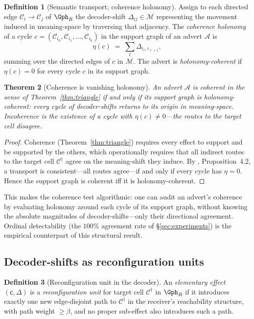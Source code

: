 \documentclass[twocolumn,11pt,a4paper]{article}
\theoremstyle{adv}
\newtheorem{theorem}{Theorem}[section]
\theoremstyle{definition}
\newtheorem{definition}[theorem]{Definition}
\theoremstyle{remark}
\newcommand{\Cell}{\mathcal{C}}        %
\newcommand{\Recv}{R}                  %
\newcommand{\floor}{\beta}            %
\newcommand{\Carrier}{\kappa}         %
\renewcommand{\Carrier}{\mathsf{c}}
\newcommand{\Mean}{\mathcal{M}}        %
\newcommand{\shift}{\Delta}            %
\newcommand{\Adv}{\mathcal{A}}        %
\begin{document}
\begin{definition}[Semantic transport; coherence holonomy]
\label{def:holonomy-ad}
Assign to each directed edge $\Cell_i\to\Cell_j$ of $\Gph_\Recv$ the
decoder-shift $\shift_{ij}\in\Mean$ representing the movement induced in
meaning-space by traversing that adjacency. The \emph{coherence holonomy} of a
cycle $c=(\Cell_{i_0},\Cell_{i_1},\dots,\Cell_{i_0})$ in the support graph of
an advert $\Adv$ is
\[
  \eta(c) \;=\; \sum_{\ell} \shift_{i_\ell,i_{\ell+1}},
\]
summing over the directed edges of $c$ in $\Mean$. The advert is
\emph{holonomy-coherent} if $\eta(c)=0$ for every cycle $c$ in its support
graph.
\end{definition}

\begin{theorem}[Coherence is vanishing holonomy]
\label{thm:coherence-holonomy}
An advert $\Adv$ is coherent in the sense of Theorem~\ref{thm:triangle} if and
only if its support graph is holonomy-coherent: every cycle of decoder-shifts
returns to its origin in meaning-space. Incoherence is the existence of a
cycle with $\eta(c)\neq0$---the routes to the target cell disagree.
\end{theorem}

\begin{proof}
Coherence (Theorem~\ref{thm:triangle}) requires every effect to support and
be supported by the others, which operationally requires that all indirect
routes to the target cell $\Cell^\dagger$ agree on the meaning-shift they
induce. By \citet{sachikonye2025knowledge}, Proposition~4.2, a transport is
consistent---all routes agree---if and only if every cycle has $\eta=0$.
Hence the support graph is coherent iff it is holonomy-coherent.
\end{proof}

This makes the coherence test algorithmic: one can audit an advert's coherence
by evaluating holonomy around each cycle of its support graph, without knowing
the absolute magnitudes of decoder-shifts---only their directional agreement.
Ordinal detectability (the $100\%$ agreement rate of \S\ref{sec:experiments})
is the empirical counterpart of this structural result.

\subsection{Decoder-shifts as reconfiguration units}

\begin{definition}[Reconfiguration unit in the decoder]
\label{def:reconfig-unit}
An \emph{elementary effect} $(\Carrier,\shift)$ is a \emph{reconfiguration unit}
for target cell $\Cell^\dagger$ in $\Gph_\Recv$ if it introduces exactly one new
edge-disjoint path to $\Cell^\dagger$ in the receiver's reachability structure,
with path weight $\ge\floor$, and no proper sub-effect also introduces such a
path.
\end{definition}
\end{document}
